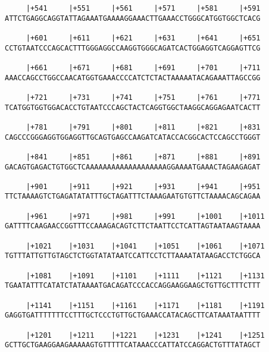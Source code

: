 \documentclass{article}
\begin{document}
\begin{Verbatim}
     |+541     |+551     |+561     |+571     |+581     |+591
ATTCTGAGGCAGGTATTAGAAATGAAAAGGAAACTTGAAACCTGGGCATGGTGGCTCACG
                                                            
     |+601     |+611     |+621     |+631     |+641     |+651
CCTGTAATCCCAGCACTTTGGGAGGCCAAGGTGGGCAGATCACTGGAGGTCAGGAGTTCG
                                                            
     |+661     |+671     |+681     |+691     |+701     |+711
AAACCAGCCTGGCCAACATGGTGAAACCCCATCTCTACTAAAAATACAGAAATTAGCCGG
                                                            
     |+721     |+731     |+741     |+751     |+761     |+771
TCATGGTGGTGGACACCTGTAATCCCAGCTACTCAGGTGGCTAAGGCAGGAGAATCACTT
                                                            
     |+781     |+791     |+801     |+811     |+821     |+831
CAGCCCGGGAGGTGGAGGTTGCAGTGAGCCAAGATCATACCACGGCACTCCAGCCTGGGT
                                                            
     |+841     |+851     |+861     |+871     |+881     |+891
GACAGTGAGACTGTGGCTCAAAAAAAAAAAAAAAAAAAGGAAAATGAAACTAGAAGAGAT
                                                            
     |+901     |+911     |+921     |+931     |+941     |+951
TTCTAAAAGTCTGAGATATATTTGCTAGATTTCTAAAGAATGTGTTCTAAAACAGCAGAA
                                                            
     |+961     |+971     |+981     |+991     |+1001    |+1011
GATTTTCAAGAACCGGTTTCCAAAGACAGTCTTCTAATTCCTCATTAGTAATAAGTAAAA
                                                            
     |+1021    |+1031    |+1041    |+1051    |+1061    |+1071
TGTTTATTGTTGTAGCTCTGGTATATAATCCATTCCTCTTAAAATATAAGACCTCTGGCA
                                                            
     |+1081    |+1091    |+1101    |+1111    |+1121    |+1131
TGAATATTTCATATCTATAAAATGACAGATCCCACCAGGAAGGAAGCTGTTGCTTTCTTT
                                                            
     |+1141    |+1151    |+1161    |+1171    |+1181    |+1191
GAGGTGATTTTTTTCCTTTGCTCCCTGTTGCTGAAACCATACAGCTTCATAAATAATTTT
                                                            
     |+1201    |+1211    |+1221    |+1231    |+1241    |+1251
GCTTGCTGAAGGAAGAAAAAGTGTTTTTCATAAACCCATTATCCAGGACTGTTTATAGCT
                                                            

\end{Verbatim}
\end{document}
